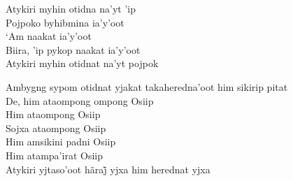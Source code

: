 \begin{linenumbers}
 
\noindent   Atykiri myhin otidna na'yt 'ip\\
  Pojpoko byhibmina ia'y'oot\\
  `Am naakat ia'y'oot\\
  Biira, 'ip pykop naakat ia'y'oot\\
  Atykiri myhin otidnat na'yt pojpok
 
\end{linenumbers}

\bigskip

\begin{linenumbers}
 
\noindent   Ambygng sypom otidnat yjakat takaheredna'oot him sikirip pitat\\
  De, him ataompong ompong Osiip\\
  Him ataompong Osiip\\
  Sojxa ataompong Osiip\\
  Him amsikini padni Osiip\\
  Him atampa'irat Osiip\\
  Atykiri yjtaso’oot hãraj̃ yjxa him herednat yjxa
 
\end{linenumbers}

\bigskip

